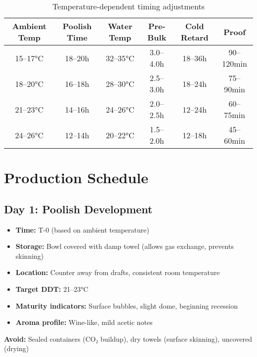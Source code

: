 \documentclass[10pt,a4paper]{article}
\begin{document}
    \begin{table}[h]
        \centering
        \small
        \begin{tabular}{@{}cccccc@{}}
            \toprule
            \textbf{Ambient Temp} & \textbf{Poolish Time} & \textbf{Water Temp} & \textbf{Pre-Bulk} & \textbf{Cold Retard} & \textbf{Proof} \\
            \midrule
            15--17°C & 18--20h & 32--35°C & 3.0--4.0h & 18--36h & 90--120min \\
            18--20°C & 16--18h & 28--30°C & 2.5--3.0h & 18--24h & 75--90min \\
            21--23°C & 14--16h & 24--26°C & 2.0--2.5h & 12--24h & 60--75min \\
            24--26°C & 12--14h & 20--22°C & 1.5--2.0h & 12--18h & 45--60min \\
            \bottomrule
        \end{tabular}
        \caption{Temperature-dependent timing adjustments}
    \end{table}

    \section{Production Schedule}

    \subsection{Day 1: Poolish Development}
    \begin{itemize}[leftmargin=*]
        \item \textbf{Time:} T-0 (based on ambient temperature)
        \item \textbf{Storage:} Bowl covered with damp towel (allows gas exchange, prevents skinning)
        \item \textbf{Location:} Counter away from drafts, consistent room temperature
        \item \textbf{Target DDT:} 21--23°C
        \item \textbf{Maturity indicators:} Surface bubbles, slight dome, beginning recession
        \item \textbf{Aroma profile:} Wine-like, mild acetic notes
    \end{itemize}

    \begin{tipbox}
        \textbf{Avoid:} Sealed containers (CO₂ buildup), dry towels (surface skinning), uncovered (drying)
    \end{tipbox}
\end{document}
